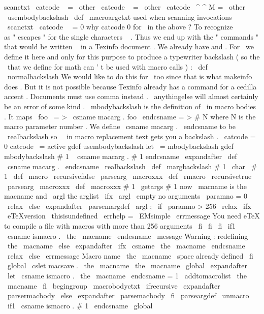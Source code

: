 {{{{{scanctxt
\
catcode
\
{
=
\
other
\
catcode
\
}
=
\
other
\
catcode
\
^
^
M
=
\
other
\
usembodybackslash
}
\
def
\
macroargctxt
{
%
used
when
scanning
invocations
\
scanctxt
\
catcode
\
\
=
0
}
%
why
catcode
0
for
\
in
the
above
?
To
recognize
\
\
\
{
\
}
as
"
escapes
"
%
for
the
single
characters
\
{
}
.
Thus
we
end
up
with
the
"
commands
"
%
that
would
be
written
\
{
}
in
a
Texinfo
document
.
%
%
We
already
have
{
and
}
.
For
\
we
define
it
here
and
only
for
%
this
purpose
to
produce
a
typewriter
backslash
(
so
the
\
that
we
%
define
for
math
can
'
t
be
used
with
macro
calls
)
:
%
\
def
\
\
{
\
normalbackslash
}
%
%
%
We
would
like
to
do
this
for
\
too
since
that
is
what
makeinfo
does
.
%
But
it
is
not
possible
because
Texinfo
already
has
a
command
for
a
%
cedilla
accent
.
Documents
must
use
comma
{
}
instead
.
%
%
\
anythingelse
will
almost
certainly
be
an
error
of
some
kind
.
%
\
mbodybackslash
is
the
definition
of
\
in
macro
bodies
.
%
It
maps
\
foo
\
=
>
\
csname
macarg
.
foo
\
endcsname
=
>
#
N
%
where
N
is
the
macro
parameter
number
.
%
We
define
\
csname
macarg
.
\
endcsname
to
be
\
realbackslash
so
%
\
\
in
macro
replacement
text
gets
you
a
backslash
.
%
{
\
catcode
=
0
catcode
\
=
active
gdef
usembodybackslash
{
let
\
=
mbodybackslash
}
gdef
mbodybackslash
#
1
\
{
csname
macarg
.
#
1
endcsname
}
}
\
expandafter
\
def
\
csname
macarg
.
\
endcsname
{
\
realbackslash
}
\
def
\
margbackslash
#
1
{
\
char
\
#
1
}
\
def
\
macro
{
\
recursivefalse
\
parsearg
\
macroxxx
}
\
def
\
rmacro
{
\
recursivetrue
\
parsearg
\
macroxxx
}
\
def
\
macroxxx
#
1
{
%
\
getargs
{
#
1
}
%
now
\
macname
is
the
macname
and
\
argl
the
arglist
\
ifx
\
argl
\
empty
%
no
arguments
\
paramno
=
0
\
relax
\
else
\
expandafter
\
parsemargdef
\
argl
;
%
\
if
\
paramno
>
256
\
relax
\
ifx
\
eTeXversion
\
thisisundefined
\
errhelp
=
\
EMsimple
\
errmessage
{
You
need
eTeX
to
compile
a
file
with
macros
with
more
than
256
arguments
}
\
fi
\
fi
\
fi
\
if1
\
csname
ismacro
.
\
the
\
macname
\
endcsname
\
message
{
Warning
:
redefining
\
the
\
macname
}
%
\
else
\
expandafter
\
ifx
\
csname
\
the
\
macname
\
endcsname
\
relax
\
else
\
errmessage
{
Macro
name
\
the
\
macname
\
space
already
defined
}
\
fi
\
global
\
cslet
{
macsave
.
\
the
\
macname
}
{
\
the
\
macname
}
%
\
global
\
expandafter
\
let
\
csname
ismacro
.
\
the
\
macname
\
endcsname
=
1
%
\
addtomacrolist
{
\
the
\
macname
}
%
\
fi
\
begingroup
\
macrobodyctxt
\
ifrecursive
\
expandafter
\
parsermacbody
\
else
\
expandafter
\
parsemacbody
\
fi
}
\
parseargdef
\
unmacro
{
%
\
if1
\
csname
ismacro
.
#
1
\
endcsname
\
global
}}}}}
